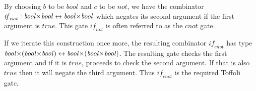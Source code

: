 \begin{center}
\scalebox{1.5}{
}
\end{center}


By choosing \ensuremath{b} to be \ensuremath{\mathit{bool}} and \ensuremath{c} to be \ensuremath{\mathit{not}}, we have the
combinator \ensuremath{\mathit{if}_{\mathit{not}} : \mathit{bool} {\prodtype}  \mathit{bool}\leftrightarrow \mathit{bool} {\prodtype}  \mathit{bool}} which negates its
second argument if the first argument is \ensuremath{\mathit{true}}. This gate
\ensuremath{\mathit{if}_{\mathit{not}}} is often referred to as the \ensuremath{\mathit{cnot}} gate\cite{Toffoli:1980}.

If we iterate this construction once more, the resulting combinator
\ensuremath{\mathit{if}_{\mathit{cnot}}} has type \ensuremath{\mathit{bool} {\prodtype}  (\mathit{bool} {\prodtype}  \mathit{bool})\leftrightarrow \mathit{bool} {\prodtype}  (\mathit{bool} {\prodtype}  \mathit{bool})}. The
resulting gate checks the first argument and if it is \ensuremath{\mathit{true}},
proceeds to check the second argument. If that is also \ensuremath{\mathit{true}} then
it will negate the third argument. Thus \ensuremath{\mathit{if}_{\mathit{cnot}}} is the required
Toffoli gate.

\begin{center}
\scalebox{1.6}{
}
\end{center}

